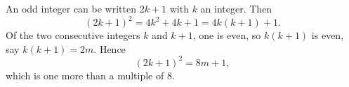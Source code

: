 An odd integer can be written $2k+1$ with $k$ an integer. Then
\[
(2k+1)^2=4k^2+4k+1=4k(k+1)+1 .
\]
Of the two consecutive integers $k$ and $k+1$, one is even, so $k(k+1)$ is even, say $k(k+1)=2m$. Hence
\[
(2k+1)^2=8m+1,
\]
which is one more than a multiple of $8$.
